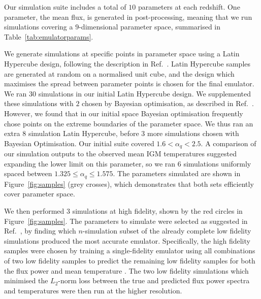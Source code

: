 \documentclass[a4paper,11pt]{article}
\begin{document}

Our simulation suite includes a total of $10$ parameters at each redshift. One parameter, the mean flux, is generated in post-processing, meaning that we run simulations covering a $9$-dimensional parameter space, summarised in Table~\ref{tab:emulatorparams}.

We generate simulations at specific points in parameter space using a Latin Hypercube design, following the description in Ref.~\cite{Bird:2019}. Latin Hypercube samples are generated at random on a normalised unit cube, and the design which maximises the spread between parameter points is chosen for the final emulator. We ran $30$ simulations in our initial Latin Hypercube design. We supplemented these simulations with $2$ chosen by Bayesian optimisation, as described in Ref.~\cite{Rogers:2019}.
However, we found that in our initial space Bayesian optimisation frequently chose points on the extreme boundaries of the parameter space.
We thus ran an extra $8$ simulation Latin Hypercube, before $3$ more simulations chosen with Bayesian Optimisation. Our initial suite covered $1.6 < \alpha_q < 2.5$. A comparison of our simulation outputs to the observed mean IGM temperatures suggested expanding the lower limit on this parameter, so we ran $6$ simulations uniformly spaced between $1.325 \leq \alpha_q \leq 1.575$. The parameters simulated are shown in Figure~\ref{fig:samples} (grey crosses), which demonstrates that both sets efficiently cover parameter space.

We then performed $3$ simulations at high fidelity, shown by the red circles in Figure~\ref{fig:samples}. The parameters to simulate were selected as suggested in Ref.~\cite{Ho:2022,Fernandez:2022}, by finding which $n$-simulation subset of the already complete low fidelity simulations produced the most accurate emulator. Specifically, the high fidelity samples were chosen by training a single-fidelity emulator using all combinations of two low fidelity samples to predict the remaining low fidelity samples for both the flux power and mean temperature \cite{Ho:2022}. The two low fidelity simulations which minimised the $L_2$-norm loss between the true and predicted flux power spectra and temperatures were then run at the higher resolution.
\end{document}
